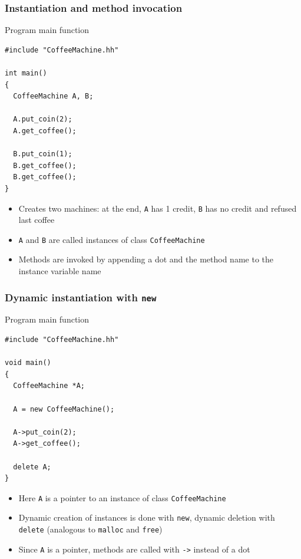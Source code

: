 \documentclass{beamer}
\begin{document}
\begin{frame}[fragile]
  \frametitle{Instantiation and method invocation}
  \begin{block}{Program main function}
    \begin{scriptsize}
\begin{verbatim}
#include "CoffeeMachine.hh"

int main()
{
  CoffeeMachine A, B;

  A.put_coin(2);
  A.get_coffee();

  B.put_coin(1);
  B.get_coffee();
  B.get_coffee();
}
\end{verbatim}
    \end{scriptsize}
  \end{block}
  \begin{itemize}
  \item Creates two machines: at the end, \texttt{A} has 1 credit, \texttt{B} has no credit and refused last coffee
  \item \texttt{A} and \texttt{B} are called \alert{instances} of class \texttt{CoffeeMachine}
  \item Methods are invoked by appending a dot and the method name to the instance variable name
  \end{itemize}
\end{frame}

\begin{frame}[fragile]
  \frametitle{Dynamic instantiation with \texttt{new}}
  \begin{block}{Program main function}
    \begin{scriptsize}
\begin{verbatim}
#include "CoffeeMachine.hh"

void main()
{
  CoffeeMachine *A;

  A = new CoffeeMachine();

  A->put_coin(2);
  A->get_coffee();

  delete A;
}
\end{verbatim}
    \end{scriptsize}
  \end{block}
  \begin{itemize}
  \item Here \texttt{A} is a pointer to an instance of class \texttt{CoffeeMachine}
  \item Dynamic creation of instances is done with \texttt{new}, dynamic deletion with \texttt{delete} (analogous to \texttt{malloc} and \texttt{free})
  \item Since \texttt{A} is a pointer, methods are called with \texttt{->} instead of a dot
  \end{itemize}
\end{frame}
\end{document}
